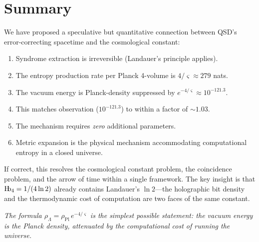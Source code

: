 \documentclass[11pt,a4paper]{article}
\theoremstyle{definition}
\newcommand{\Hb}{\textnormal{H\kern-0.3em b}}
\newcommand{\Hbfour}{\Hb_4}
\newcommand{\strain}{\varsigma}            %
\newcommand{\rhoL}{\rho_{\Lambda}}
\newcommand{\rhoPl}{\rho_{\text{Pl}}}
\begin{document}
\section{Summary}

We have proposed a speculative but quantitative connection between QSD's error-correcting spacetime and the cosmological constant:

\begin{enumerate}
    \item Syndrome extraction is irreversible (Landauer's principle applies).
    \item The entropy production rate per Planck 4-volume is $4/\strain \approx 279$ nats.
    \item The vacuum energy is Planck-density suppressed by $e^{-4/\strain} \approx 10^{-121.3}$.
    \item This matches observation ($10^{-121.3}$) to within a factor of $\sim 1.03$.
    \item The mechanism requires \emph{zero} additional parameters.
    \item Metric expansion is the physical mechanism accommodating computational entropy in a closed universe.
\end{enumerate}

If correct, this resolves the cosmological constant problem, the coincidence problem, and the arrow of time within a single framework. The key insight is that $\Hbfour = 1/(4\ln 2)$ already contains Landauer's $\ln 2$---the holographic bit density and the thermodynamic cost of computation are two faces of the same constant.

\bigskip
\noindent\textit{The formula $\rhoL = \rhoPl\,e^{-4/\strain}$ is the simplest possible statement: the vacuum energy is the Planck density, attenuated by the computational cost of running the universe.}





\end{document}
